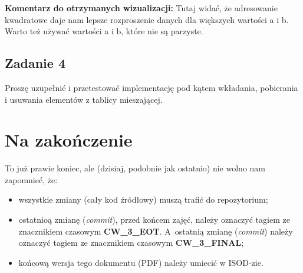 \documentclass[twoside]{article}
\begin{document}
\noindent \textbf{Komentarz do otrzymanych wizualizacji:}
Tutaj widać, że adresowanie kwadratowe daje nam lepsze rozproszenie danych dla większych wartości a i b. Warto też używać wartości a i b, które nie są parzyste.

\newpage

\subsection{Zadanie 4}
Proszę uzupełnić i przetestować implementację pod kątem wkładania, pobierania i usuwania
elementów z tablicy mieszającej.

\section{Na zakończenie}
To już prawie koniec, ale (dzisiaj, podobnie jak ostatnio) nie wolno nam zapomnieć, że:
\begin{itemize}
    \item wszystkie zmiany (cały kod źródłowy) muszą trafić do repozytorium;
    \item ostatnioą zmianę (\textit{commit}), przed końcem zajęć, należy oznaczyć tagiem ze znacznikiem czasowym \textbf{CW\_3\_EOT}.
    A~ostatnią zmianę (\textit{commit}) należy oznaczyć tagiem ze znacznikiem czasowym \textbf{CW\_3\_FINAL};
    \item końcową wersja tego dokumentu (PDF) należy umiecić w ISOD-zie.
\end{itemize}
\end{document}
